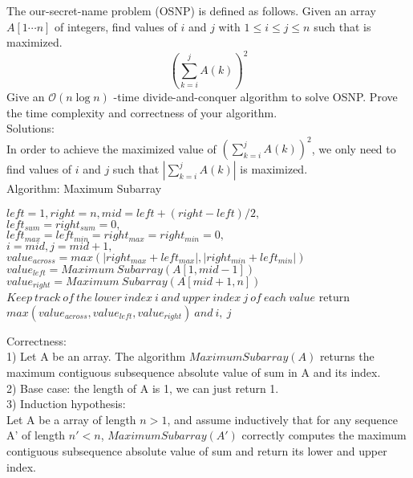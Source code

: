 \documentclass[12pt,letterpaper]{article}
\begin{document}
\begin{enumerate}
The our-secret-name problem (OSNP) is defined as follows. Given an array $A[1 \cdots n]$ of integers, find values of $i$ and $j$ with $1 \le i \le j \le n$ such that
is maximized. \\
$$(\sum\limits_{k=i}^j A(k))^2$$
Give an $\mathcal{O} (n \log n)$ -time divide-and-conquer algorithm to solve OSNP. Prove the time complexity and correctness of your algorithm. \\
Solutions: \\
In order to achieve the maximized value of $(\sum\limits_{k=i}^j A(k))^2$, we only need to find values of $i$ and $j$ such that $|\sum\limits_{k=i}^{j} A(k)|$ is maximized. \\
Algorithm: Maximum Subarray\\
\begin{algorithm}[H]
$ left = 1, right = n, mid = left + (right - left)/2,$ \\ 
$left_{sum} =  right_{sum} = 0,$ \\
$left_{max} = left_{min} = right_{max} = right_{min} = 0,$ \\
$i = mid, j = mid+1,$\;
$value_{across} = max(|right_{max}+left_{max}|,|right_{min}+left_{min}|)$\;
$value_{left} = Maximum \ Subarray (A[1,mid - 1])$\;
$value_{right} = Maximum \ Subarray (A[mid + 1,n])$\;
$Keep \ track \ of \ the \ lower \ index \ i \ and \ upper \ index \ j \ of \ each \ value$ \;
return $max(value_{across},value_{left},value_{right}) \ and \ i , \ j$\;
\end{algorithm}
Correctness: \\
1) Let A be an array. The algorithm $Maximum Subarray(A)$ returns the maximum contiguous subsequence absolute value of sum in A and its index. \\
2) Base case: the length of A is 1, we can just return 1. \\
3) Induction hypothesis: \\
Let A be a array of length $n > 1$, and assume inductively that for any sequence A' of length $n' < n$, $Maximum Subarray(A')$ correctly computes the maximum contiguous subsequence absolute value of sum and return its lower and upper index. \\

\end{enumerate}
\end{document}
